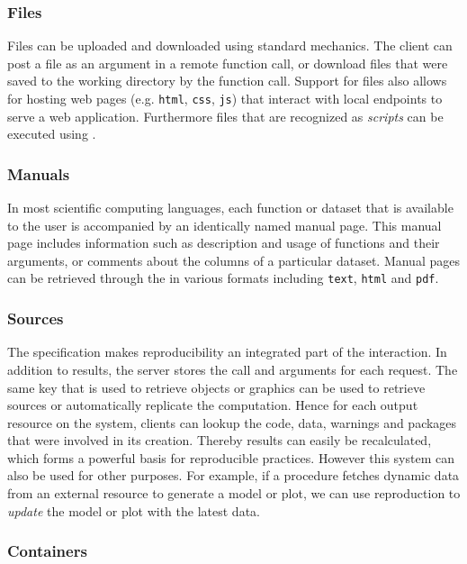 \subsubsection{Files}

Files can be uploaded and downloaded using standard \HTTP mechanics. The client can post a file as an argument in a remote function call, or download files that were saved to the working directory by the function call. Support for files also allows for hosting web pages (e.g. \texttt{html}, \texttt{css}, \texttt{js}) that interact with local \API endpoints to serve a web application. Furthermore files that are recognized as \emph{scripts} can be executed using \RPC.

\subsubsection{Manuals}

In most scientific computing languages, each function or dataset that is available to the user is accompanied by an identically named manual page. This manual page includes information such as description and usage of functions and their arguments, or comments about the columns of a particular dataset. Manual pages can be retrieved through the \API in various formats including \texttt{text}, \texttt{html} and \texttt{pdf}.

\subsubsection{Sources}

The \OpenCPU specification makes reproducibility an integrated part of the \API interaction. In addition to results, the server stores the call and arguments for each \RPC request. The same key that is used to retrieve objects or graphics can be used to retrieve sources or automatically replicate the computation. Hence for each output resource on the system, clients can lookup the code, data, warnings and packages that were involved in its creation. Thereby results can easily be recalculated, which forms a powerful basis for reproducible practices. However this system can also be used for other purposes. For example, if a procedure fetches dynamic data from an external resource to generate a model or plot, we can use reproduction to \emph{update} the model or plot with the latest data.

\subsubsection{Containers}

